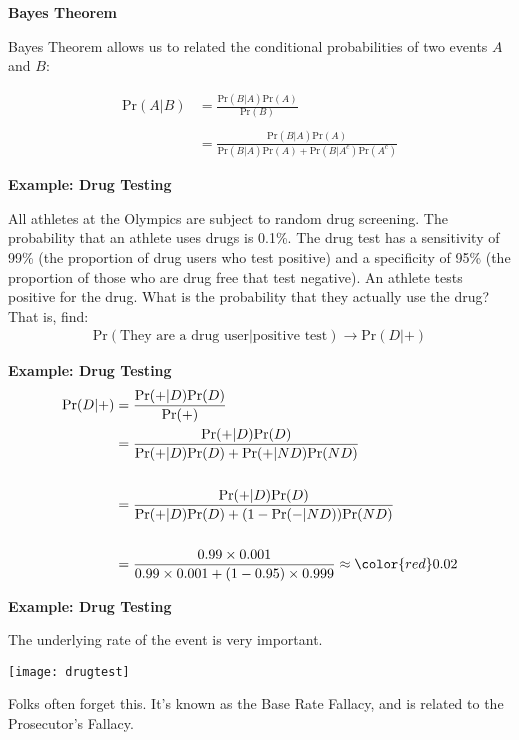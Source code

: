 \documentclass[12pt,xcolor=svgnames]{beamer}
\newcommand{\rd}{\color{red}}
\newcommand{\theme}{\color{FireBrick}}
\newcommand{\sk}{\vspace{.4cm}}
\newcommand{\nsk}{\vspace{-.4cm}}
\newcommand{\chap}[1]{{\theme \Large \bf #1} \sk}
\newcommand{\pr}{\text{Pr}}
\begin{document}
\begin{frame}
\chap{Bayes Theorem} 

Bayes Theorem allows us to related the conditional probabilities of two events $A$ and $B$:

\begin{align*}
\pr(A|B) & = \frac{\pr(B|A)\pr(A)}{\pr(B)}\\
&\\
& =  \frac{\pr(B|A)\pr(A)}{\pr(B|A)\pr(A) + \pr(B|A^c)\pr(A^c)}
\end{align*}

\end{frame}


\begin{frame}
\chap{Example: Drug Testing}

All athletes at the Olympics are subject to random drug screening. The probability that an athlete uses drugs is 0.1\%. The drug test has a sensitivity of 99\% (the proportion of drug users who test positive) and a specificity of 95\% (the proportion of those who are drug free that test negative). An athlete tests positive for the drug. What is the probability that they actually use the drug? That is, find:
\begin{align*}
\pr(\text{They are a drug user}|\text{positive test})\rightarrow \pr(D |+ )
\end{align*}

\end{frame}

\begin{frame}
\chap{Example: Drug Testing}
\nsk
\begin{align*}
\pr(D |+ ) & = \frac{\pr(+|D)\pr(D)}{\pr(+)}\\
& =  \frac{\pr(+|D)\pr(D)}{\pr(+|D)\pr(D) + \pr(+|ND)\pr(ND)}\\
&\\
& =  \frac{\pr(+|D)\pr(D)}{\pr(+|D)\pr(D) + (1-\pr(-|ND))\pr(ND)}\\
&\\
& = \frac{0.99\times0.001}{0.99\times0.001 + (1-0.95)\times0.999} \approx {\rd 0.02} 
\end{align*}


\end{frame}

\begin{frame}
\chap{Example: Drug Testing}

The underlying rate of the event is very important. 

\begin{center}
\texttt{[image: drugtest]}
\end{center}

Folks often forget this. It's known as the {\rd Base Rate Fallacy}, and is related to the {\rd Prosecutor's Fallacy}.

\end{frame}
\end{document}
